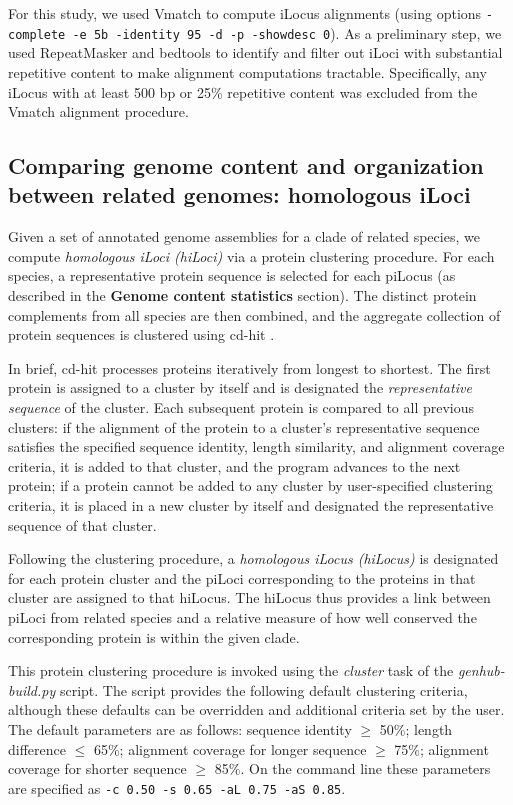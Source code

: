For this study, we used Vmatch \cite{Vmatch} to compute iLocus alignments (using options \texttt{-complete -e 5b -identity 95 -d -p -showdesc 0}).
As a preliminary step, we used RepeatMasker \cite{RepeatMasker,RepBase} and bedtools \cite{bedtools} to identify and filter out iLoci with substantial repetitive content to make alignment computations tractable.
Specifically, any iLocus with at least 500 bp or 25\% repetitive content was excluded from the Vmatch alignment procedure.


\subsection{Comparing genome content and organization between related genomes: homologous iLoci}
Given a set of annotated genome assemblies for a clade of related species, we compute \textit{homologous iLoci (hiLoci)} via a protein clustering procedure.
For each species, a representative protein sequence is selected for each piLocus (as described in the \textbf{Genome content statistics} section).
The distinct protein complements from all species are then combined, and the aggregate collection of protein sequences is clustered using cd-hit \cite{cdhit}.

In brief, cd-hit processes proteins iteratively from longest to shortest.
The first protein is assigned to a cluster by itself and is designated the \textit{representative sequence} of the cluster.
Each subsequent protein is compared to all previous clusters:
if the alignment of the protein to a cluster's representative sequence satisfies the specified sequence identity, length similarity, and alignment coverage criteria, it is added to that cluster, and the program advances to the next protein;
if a protein cannot be added to any cluster by user-specified clustering criteria, it is placed in a new cluster by itself and designated the representative sequence of that cluster.

Following the clustering procedure, a \textit{homologous iLocus (hiLocus)} is designated for each protein cluster and the piLoci corresponding to the proteins in that cluster are assigned to that hiLocus.
The hiLocus thus provides a link between piLoci from related species and a relative measure of how well conserved the corresponding protein is within the given clade.

This protein clustering procedure is invoked using the \textit{cluster} task of the \textit{genhub-build.py} script.
The script provides the following default clustering criteria, although these defaults can be overridden and additional criteria set by the user.
The default parameters are as follows: sequence identity $\geq$ 50\%; length difference $\leq$ 65\%; alignment coverage for longer sequence $\geq$ 75\%; alignment coverage for shorter sequence $\geq$ 85\%.
On the command line these parameters are specified as \texttt{-c 0.50 -s 0.65 -aL 0.75 -aS 0.85}.


